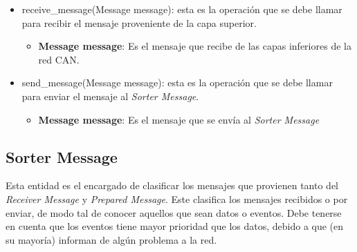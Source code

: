 \begin{itemize}
\item receive\_message(Message message): esta es la operación que se debe llamar
  para recibir el mensaje proveniente de la capa superior. 
  \begin{itemize}
  \item \textbf{Message message}: Es el mensaje que recibe de las capas inferiores
    de la red CAN.
  \end{itemize}

  \item send\_message(Message message): esta es la operación que se debe llamar
  para enviar el mensaje al \textit{Sorter Message}.
  \begin{itemize}
  \item \textbf{Message message}: Es el mensaje que se envía al \textit{Sorter
    Message}
  \end{itemize}
\end{itemize}


\subsection{Sorter Message}
Esta entidad es el encargado de clasificar los mensajes que provienen tanto del
\textit{Receiver Message} y \textit{Prepared Message}. Este clasifica los
mensajes recibidos o por enviar, de modo tal de conocer aquellos que sean
datos o eventos. Debe tenerse en cuenta que los eventos tiene mayor prioridad
que los datos, debido a que (en su mayoría) informan de algún problema a la red.

